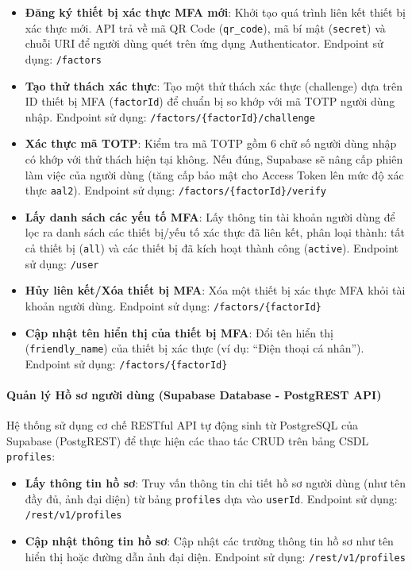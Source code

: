 \begin{itemize}
\item \textbf{Đăng ký thiết bị xác thực MFA mới}:
Khởi tạo quá trình liên kết thiết bị xác thực mới. API trả về mã QR Code (\texttt{qr\_code}), mã bí mật (\texttt{secret}) và chuỗi URI để người dùng quét trên ứng dụng Authenticator.
Endpoint sử dụng: \texttt{/factors}

\item \textbf{Tạo thử thách xác thực}:
Tạo một thử thách xác thực (challenge) dựa trên ID thiết bị MFA (\texttt{factorId}) để chuẩn bị so khớp với mã TOTP người dùng nhập.
Endpoint sử dụng: \texttt{/factors/\{factorId\}/challenge}

\item \textbf{Xác thực mã TOTP}:
Kiểm tra mã TOTP gồm 6 chữ số người dùng nhập có khớp với thử thách hiện tại không. Nếu đúng, Supabase sẽ nâng cấp phiên làm việc của người dùng (tăng cấp bảo mật cho Access Token lên mức độ xác thực \texttt{aal2}).
Endpoint sử dụng: \texttt{/factors/\{factorId\}/verify}

\item \textbf{Lấy danh sách các yếu tố MFA}:
Lấy thông tin tài khoản người dùng để lọc ra danh sách các thiết bị/yếu tố xác thực đã liên kết, phân loại thành: tất cả thiết bị (\texttt{all}) và các thiết bị đã kích hoạt thành công (\texttt{active}).
Endpoint sử dụng: \texttt{/user}

\item \textbf{Hủy liên kết/Xóa thiết bị MFA}:
Xóa một thiết bị xác thực MFA khỏi tài khoản người dùng.
Endpoint sử dụng: \texttt{/factors/\{factorId\}}

\item \textbf{Cập nhật tên hiển thị của thiết bị MFA}:
Đổi tên hiển thị (\texttt{friendly\_name}) của thiết bị xác thực (ví dụ: \enquote{Điện thoại cá nhân}).
Endpoint sử dụng: \texttt{/factors/\{factorId\}}

\end{itemize}

\paragraph{Quản lý Hồ sơ người dùng (Supabase Database - PostgREST API)}

Hệ thống sử dụng cơ chế RESTful API tự động sinh từ PostgreSQL của Supabase (PostgREST) để thực hiện các thao tác CRUD trên bảng CSDL \texttt{profiles}:

\begin{itemize}
\item \textbf{Lấy thông tin hồ sơ}:
Truy vấn thông tin chi tiết hồ sơ người dùng (như tên đầy đủ, ảnh đại diện) từ bảng \texttt{profiles} dựa vào \texttt{userId}.
Endpoint sử dụng: \texttt{/rest/v1/profiles}

\item \textbf{Cập nhật thông tin hồ sơ}:
Cập nhật các trường thông tin hồ sơ như tên hiển thị hoặc đường dẫn ảnh đại diện.
Endpoint sử dụng: \texttt{/rest/v1/profiles}
\end{itemize}

